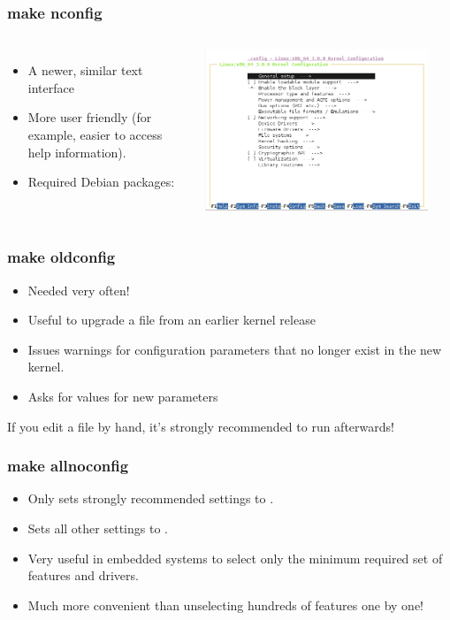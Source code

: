 \begin{frame}
  \frametitle{make nconfig}
  \begin{columns}
    \begin{itemize}
      \item A newer, similar text interface
      \item More user friendly (for example, easier to access help information).
      \item Required Debian packages: 
    \end{itemize}
    \includegraphics[width=0.9\textwidth]{slides/sysdev-linux-intro-configuration/nconfig-screenshot.png}
  \end{columns}
\end{frame}

\begin{frame}
  \frametitle{make oldconfig}
  \begin{itemize}
  \item Needed very often!
  \item Useful to upgrade a  file from an earlier kernel release
  \item Issues warnings for configuration parameters that no longer
    exist in the new kernel.
  \item Asks for values for new parameters
  \end{itemize}
  If you edit a  file by hand, it's strongly recommended
  to run  afterwards!
\end{frame}

\begin{frame}
  \frametitle{make allnoconfig}
  \begin{itemize}
  \item Only sets strongly recommended settings to .
  \item Sets all other settings to .
  \item Very useful in embedded systems to select only the minimum
    required set of features and drivers.
  \item Much more convenient than unselecting hundreds of features one
    by one!
  \end{itemize}
\end{frame}

